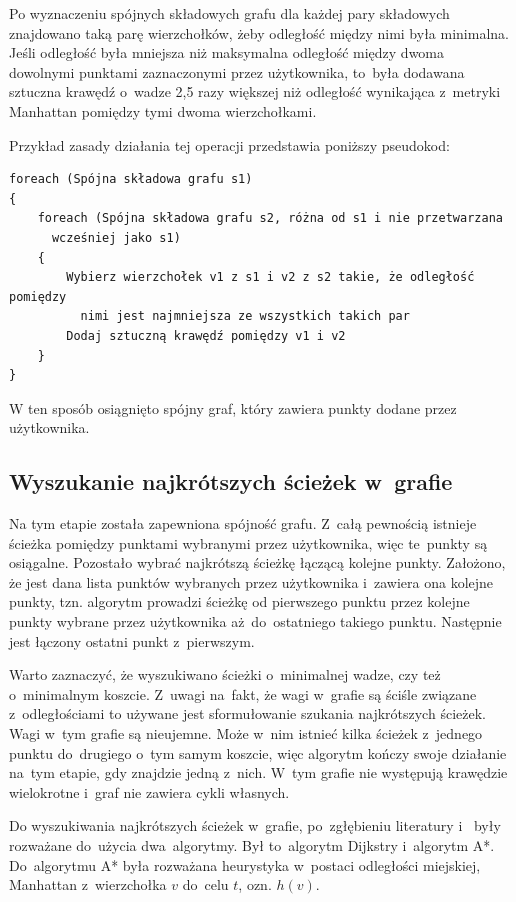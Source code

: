 \documentclass[a4paper,11pt,twoside,openright]{report}
\theoremstyle{definition}
\begin{document}
Po wyznaczeniu spójnych składowych grafu dla każdej pary składowych znajdowano
taką parę wierzchołków, żeby odległość między nimi była minimalna. Jeśli odległość
była mniejsza niż maksymalna odległość między dwoma dowolnymi punktami zaznaczonymi
przez użytkownika, to~była dodawana sztuczna krawędź o~wadze 2,5 razy większej
niż odległość wynikająca z~metryki Manhattan pomiędzy tymi dwoma wierzchołkami.

Przykład zasady działania tej operacji przedstawia poniższy pseudokod:

\begin{verbatim}
foreach (Spójna składowa grafu s1)
{
    foreach (Spójna składowa grafu s2, różna od s1 i nie przetwarzana
      wcześniej jako s1)
    {
        Wybierz wierzchołek v1 z s1 i v2 z s2 takie, że odległość pomiędzy
          nimi jest najmniejsza ze wszystkich takich par
        Dodaj sztuczną krawędź pomiędzy v1 i v2
    }
}
\end{verbatim}


W ten sposób osiągnięto spójny graf, który zawiera punkty dodane przez użytkownika.

\subsection {Wyszukanie najkrótszych ścieżek w~grafie}

Na tym etapie została zapewniona spójność grafu. Z~całą pewnością istnieje ścieżka
pomiędzy punktami wybranymi przez użytkownika, więc te~punkty są osiągalne. Pozostało
wybrać najkrótszą ścieżkę łączącą kolejne punkty. Założono, że jest dana lista
punktów wybranych przez użytkownika i~zawiera ona kolejne punkty, tzn. algorytm
prowadzi ścieżkę od pierwszego punktu przez kolejne punkty wybrane przez użytkownika
aż~do~ostatniego takiego punktu. Następnie jest łączony ostatni punkt z~pierwszym.

Warto zaznaczyć, że wyszukiwano ścieżki o~minimalnej wadze, czy też o~minimalnym
koszcie. Z~uwagi na~fakt, że wagi w~grafie są ściśle związane z~odległościami to
używane jest sformułowanie szukania najkrótszych ścieżek. Wagi w~tym grafie są
nieujemne. Może w~nim istnieć kilka ścieżek z~jednego punktu do~drugiego o~tym
samym koszcie, więc algorytm kończy swoje działanie na~tym etapie, gdy znajdzie
jedną z~nich. W~tym grafie nie występują krawędzie wielokrotne i~graf nie zawiera
cykli własnych.

Do wyszukiwania najkrótszych ścieżek w~grafie, po~zgłębieniu literatury
\cite{Algorytmy Sedgewick} i~\cite{AiSD2} były rozważane do~użycia dwa~algorytmy.
Był to~algorytm Dijkstry i~algorytm A*. Do~algorytmu A* była rozważana heurystyka w~postaci
odległości miejskiej, Manhattan z~wierzchołka $v$ do~celu $t$, ozn. $h(v)$.
\end{document}
